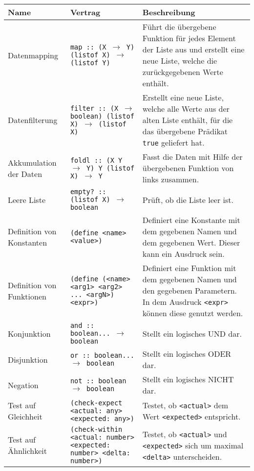        \begin{sidewaystable}
            \centering
            \begin{tabular}{p{5cm} | p{7cm} | p{9cm}}
                Name & Vertrag & Beschreibung \\
                \hline
                Datenmapping & \texttt{map :: (X $ \rightarrow $ Y) (listof X) $ \rightarrow $ (listof Y)} & Führt die übergebene Funktion für jedes Element der Liste aus und erstellt eine neue Liste, welche die zurückgegebenen Werte enthält. \\
                Datenfilterung & \texttt{filter :: (X $ \rightarrow $ boolean) (listof X) $ \rightarrow $ (listof X)} & Erstellt eine neue Liste, welche alle Werte aus der alten Liste enthält, für die das übergebene Prädikat \texttt{true} geliefert hat. \\
                Akkumulation der Daten & \texttt{foldl :: (X Y $ \rightarrow $ Y) Y (listof X) $ \rightarrow $ Y} & Fasst die Daten mit Hilfe der übergebenen Funktion von links zusammen. \\
                Leere Liste & \texttt{empty? :: (listof X) $ \rightarrow $ boolean} & Prüft, ob die Liste leer ist. \\
                \hline
                Definition von Konstanten & \texttt{(define <name> <value>)} & Definiert eine Konstante mit dem gegebenen Namen und dem gegebenen Wert. Dieser kann ein Ausdruck sein. \\
                Definition von Funktionen & \texttt{(define (<name> <arg1> <arg2> ... <argN>) <expr>)} & Definiert eine Funktion mit dem gegebenen Namen und den gegebenen Parametern. In dem Ausdruck \texttt{<expr>} können diese genutzt werden. \\
                \hline
                Konjunktion & \texttt{and :: boolean... $ \rightarrow $ boolean} & Stellt ein logisches UND dar. \\
                Disjunktion & \texttt{or :: boolean... $ \rightarrow $ boolean} & Stellt ein logisches ODER dar. \\
                Negation & \texttt{not :: boolean $ \rightarrow $ boolean} & Stellt ein logisches NICHT dar. \\
                \hline
                Test auf Gleichheit & \texttt{(check-expect <actual: any> <expected: any>)} & Testet, ob \texttt{<actual>} dem Wert \texttt{<expected>} entspricht. \\
                Test auf Ähnlichkeit & \texttt{(check-within <actual: number> <expected: number> <delta: number>)} & Testet, ob \texttt{<actual>} und \texttt{<expected>} sich um maximal \texttt{<delta>} unterscheiden. \\

\end{tabular}
\end{sidewaystable}
